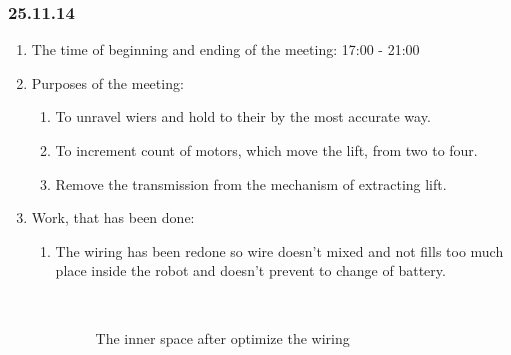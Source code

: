 \subsubsection{25.11.14}

\begin{enumerate}
	\item The time of beginning and ending of the meeting:
	17:00 - 21:00
	\item Purposes of the meeting:
	\begin{enumerate}
		\item To unravel wiers and hold to their by the most accurate way.
		
		\item To increment count of motors, which move the lift, from two to four.
		
		\item Remove the transmission from the mechanism of extracting lift.
		
	\end{enumerate}
	\item Work, that has been done:
	\begin{enumerate}
		\item The wiring has been redone so wire doesn't mixed and not fills too much place inside the robot and doesn't prevent to change of battery.
		
		\begin{figure}[H]
			\begin{minipage}[h]{0.2\linewidth}
				\center  
			\end{minipage}
			\begin{minipage}[h]{0.6\linewidth}
				\caption{The inner space after	optimize the wiring}
			\end{minipage}
		\end{figure}
		

\end{enumerate}
\end{enumerate}
